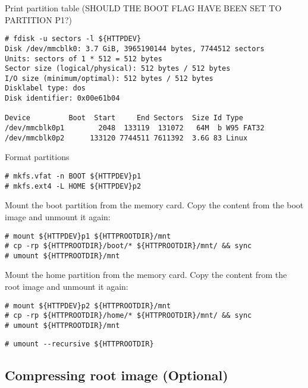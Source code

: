 Print partition table (SHOULD THE BOOT FLAG HAVE BEEN SET TO PARTITION P1?)
\begin{lstlisting}[]
# fdisk -u sectors -l ${HTTPDEV}
Disk /dev/mmcblk0: 3.7 GiB, 3965190144 bytes, 7744512 sectors
Units: sectors of 1 * 512 = 512 bytes
Sector size (logical/physical): 512 bytes / 512 bytes
I/O size (minimum/optimal): 512 bytes / 512 bytes
Disklabel type: dos
Disk identifier: 0x00e61b04

Device         Boot  Start     End Sectors  Size Id Type
/dev/mmcblk0p1        2048  133119  131072   64M  b W95 FAT32
/dev/mmcblk0p2      133120 7744511 7611392  3.6G 83 Linux
\end{lstlisting}
\FloatBarrier
\vspace{-5mm}

Format partitions
\begin{lstlisting}[]
# mkfs.vfat -n BOOT ${HTTPDEV}p1
# mkfs.ext4 -L HOME ${HTTPDEV}p2
\end{lstlisting}
\FloatBarrier
\vspace{-5mm}






Mount the boot partition from the memory card. Copy the content from the
boot image and unmount it again:
\begin{lstlisting}[]
# mount ${HTTPDEV}p1 ${HTTPROOTDIR}/mnt
# cp -rp ${HTTPROOTDIR}/boot/* ${HTTPROOTDIR}/mnt/ && sync
# umount ${HTTPROOTDIR}/mnt
\end{lstlisting}
\FloatBarrier
\vspace{-5mm}

Mount the home partition from the memory card. Copy the content from the
root image and unmount it again:
\begin{lstlisting}[]
# mount ${HTTPDEV}p2 ${HTTPROOTDIR}/mnt
# cp -rp ${HTTPROOTDIR}/home/* ${HTTPROOTDIR}/mnt/ && sync
# umount ${HTTPROOTDIR}/mnt
\end{lstlisting}
\FloatBarrier
\vspace{-5mm}


\begin{lstlisting}[]
# umount --recursive ${HTTPROOTDIR}
\end{lstlisting}
\FloatBarrier
\vspace{-5mm}


\subsection{Compressing root image (Optional)}

